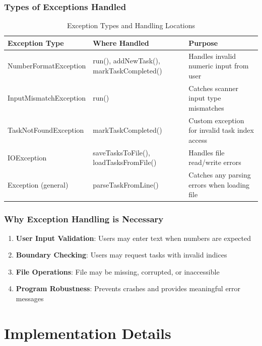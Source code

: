 \documentclass[12pt,a4paper]{article}
\begin{document}
\subsubsection{Types of Exceptions Handled}

\begin{table}[H]
\centering
\begin{tabular}{|l|p{4cm}|p{5cm}|}
\hline
\textbf{Exception Type} & \textbf{Where Handled} & \textbf{Purpose} \\
\hline
NumberFormatException & run(), addNewTask(), markTaskCompleted() & Handles invalid numeric input from user \\
\hline
InputMismatchException & run() & Catches scanner input type mismatches \\
\hline
TaskNotFoundException & markTaskCompleted() & Custom exception for invalid task index access \\
\hline
IOException & saveTasksToFile(), loadTasksFromFile() & Handles file read/write errors \\
\hline
Exception (general) & parseTaskFromLine() & Catches any parsing errors when loading file \\
\hline
\end{tabular}
\caption{Exception Types and Handling Locations}
\end{table}

\subsubsection{Why Exception Handling is Necessary}

\begin{enumerate}
    \item \textbf{User Input Validation}: Users may enter text when numbers are expected
    \item \textbf{Boundary Checking}: Users may request tasks with invalid indices
    \item \textbf{File Operations}: File may be missing, corrupted, or inaccessible
    \item \textbf{Program Robustness}: Prevents crashes and provides meaningful error messages
\end{enumerate}
\newpage
\section{Implementation Details}
\end{document}
